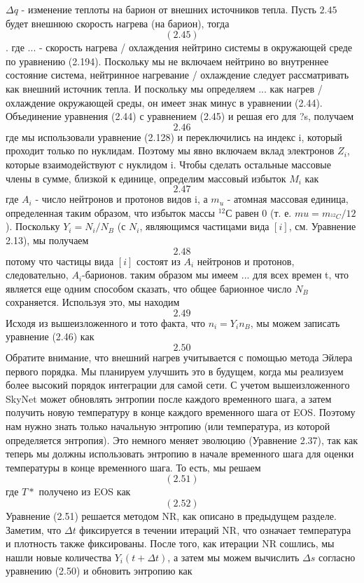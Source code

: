 \documentclass[%
bachelor,    %
natbib,      %
subf,        %
href,        %
colorlinks,  %
]{disser}
\begin{document}
$\Delta q$ - изменение теплоты на барион от внешних источников тепла. Пусть $2.45$ будет  внешнюю скорость нагрева (на барион), тогда
$$(2.45)$$.
где $...$ - скорость нагрева / охлаждения нейтрино системы в окружающей среде по уравнению (2.194). Поскольку мы не включаем нейтрино во внутреннее состояние система, нейтринное нагревание / охлаждение следует рассматривать как внешний источник тепла. И поскольку мы определяем $...$ как нагрев / охлаждение окружающей среды, он имеет знак минус в уравнении (2.44). Объединение уравнения (2.44) с уравнением (2.45) и решая его для ?s, получаем
$$2.46$$
где мы использовали уравнение (2.128) и переключились на индекс i, который проходит только по нуклидам. Поэтому мы явно включаем вклад электронов $Z_i$, которые взаимодействуют с нуклидом i. Чтобы сделать остальные массовые члены в сумме, близкой к единице, определим массовый избыток $M_i$ как
$$2.47$$
где $A_i$ - число нейтронов и протонов видов i, а $m_u$ - атомная массовая единица, определенная таким образом, что избыток массы $^{12} С$ равен 0 (т. е. $mu = m_{^{12}C} / 12$). Поскольку $Y_i = N_i / N_B$ (с $N_i$, являющимся частицами вида $[i]$, см. Уравнение 2.13), мы получаем
$$2.48$$
потому что частицы вида $[i]$ состоят из $A_i$ нейтронов и протонов, следовательно, $A_i$-барионов. таким образом мы имеем $...$ для всех времен t, что является еще одним способом сказать, что общее барионное число $N_B$ сохраняется. Используя это, мы находим
$$2.49$$
Исходя из вышеизложенного и тото факта, что $n_i=Y_i n_B$, мы можем записать уравнение (2.46) как
$$2.50$$
Обратите внимание, что внешний нагрев учитывается с помощью метода Эйлера первого порядка. Мы планируем улучшить это в будущем, когда мы реализуем более высокий порядок интеграции для самой сети. С учетом вышеизложенного SkyNet может обновлять энтропии после каждого временного шага, а затем получить новую температуру в конце каждого временного шага от EOS. Поэтому нам нужно знать только начальную энтропию (или температура, из которой определяется энтропия). Это немного меняет эволюцию (Уравнение 2.37), так как теперь мы должны использовать энтропию в начале временного шага для оценки температуры в конце временного шага. То есть, мы
решаем
$$(2.51)$$
где $T*$ получено из EOS как
$$(2.52)$$
Уравнение (2.51) решается методом NR, как описано в предыдущем разделе. Заметим, что $\Delta t$ фиксируется в течении итераций NR, что означает температура и плотность также фиксированы. После того, как итерации NR сошлись, мы нашли новые количества $Y_i(t + \Delta t)$, а затем мы можем вычислить $\Delta s$ согласно уравнению (2.50) и обновить энтропию как
\end{document}
